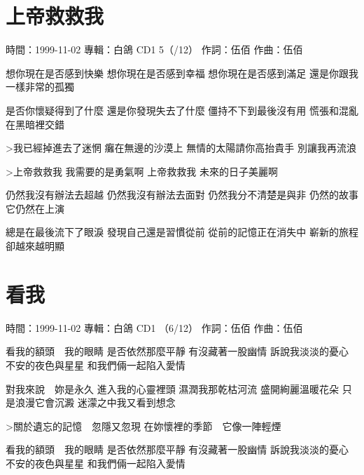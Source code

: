 \documentclass[UTF8,a4paper,oneside,twocolumn,12pt]{ctexbook}
\newcommand{\infopair}[2]{\textbullet #1：#2}
\newcommand{\zc}[1][伍佰]{\infopair{作詞}{#1}}
\newcommand{\zq}[1][伍佰]{\infopair{作曲}{#1}}
\newcommand{\zj}[1]{\infopair{專輯}{#1}}
\newcommand{\sj}[1]{\infopair{時間}{#1}}
\newenvironment{info}{\begin{flushleft}\kaishu
	}
	{\end{flushleft}\normalsize\yahei\par}
\newenvironment{lyric}{
	}
{}
\begin{document}
\section{上帝救救我}
\begin{info}
	\sj{1999-11-02}
	\zj{白鴿 CD1 5（/12）}
	\zc
	\zq
\end{info}
\begin{lyric}
	想你現在是否感到快樂
	想你現在是否感到幸福
	想你現在是否感到滿足
	還是你跟我一樣非常的孤獨

	是否你懷疑得到了什麼
	還是你發現失去了什麼
	僵持不下到最後沒有用
	慌張和混亂在黑暗裡交錯

	>我已經掉進去了迷惘
	癱在無邊的沙漠上
	無情的太陽請你高抬貴手
	別讓我再流浪

	>上帝救救我
	我需要的是勇氣啊
	上帝救救我
	未來的日子美麗啊

	仍然我沒有辦法去超越
	仍然我沒有辦法去面對
	仍然我分不清楚是與非
	仍然的故事它仍然在上演

	總是在最後流下了眼淚
	發現自己還是習慣從前
	從前的記憶正在消失中
	嶄新的旅程卻越來越明顯
\end{lyric}

\section{看我}
\begin{info}
	\sj{1999-11-02}
	\zj{白鴿 CD1 （6/12）}
	\zc
	\zq
\end{info}
\begin{lyric}
	看我的額頭　我的眼睛
	是否依然那麼平靜
	有沒藏著一股幽情
	訴說我淡淡的憂心
	不安的夜色與星星
	和我們倆一起陷入愛情

	對我來說　妳是永久
	進入我的心靈裡頭
	濕潤我那乾枯河流
	盛開絢麗溫暖花朵
	只是浪漫它會沉澱
	迷濛之中我又看到想念

	>關於遺忘的記憶　忽隱又忽現
	在妳懷裡的季節　它像一陣輕煙

	看我的額頭　我的眼睛
	是否依然那麼平靜
	有沒藏著一股幽情
	訴說我淡淡的憂心
	不安的夜色與星星
	和我們倆一起陷入愛情
\end{lyric}
\end{document}
